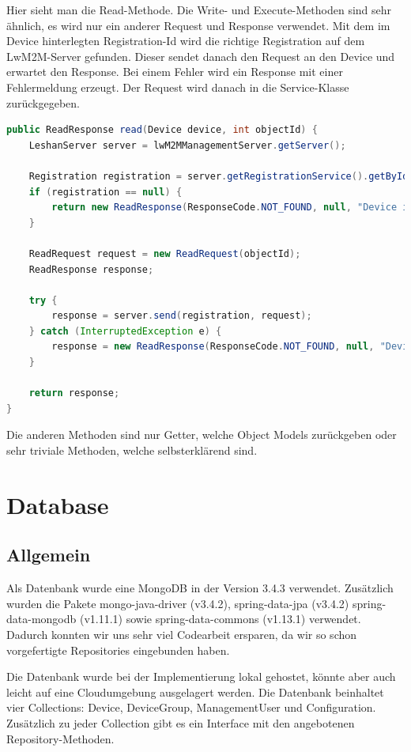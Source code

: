 Hier sieht man die Read-Methode. Die Write- und Execute-Methoden sind sehr ähnlich, es wird nur ein anderer Request und Response verwendet. Mit dem im Device hinterlegten Registration-Id wird die richtige Registration auf dem LwM2M-Server gefunden. Dieser sendet danach den Request an den Device und erwartet den Response. Bei einem Fehler wird ein Response mit einer Fehlermeldung erzeugt. Der Request wird danach in die Service-Klasse zurückgegeben.
\begin{lstlisting}[language=java]
public ReadResponse read(Device device, int objectId) {
	LeshanServer server = lwM2MManagementServer.getServer();

	Registration registration = server.getRegistrationService().getById(device.getRegId());
	if (registration == null) {
		return new ReadResponse(ResponseCode.NOT_FOUND, null, "Device is not reachable");
	}

	ReadRequest request = new ReadRequest(objectId);
	ReadResponse response;

	try {
		response = server.send(registration, request);
	} catch (InterruptedException e) {
		response = new ReadResponse(ResponseCode.NOT_FOUND, null, "Device is not reachable");
	}

	return response;
}
\end{lstlisting}

Die anderen Methoden sind nur Getter, welche Object Models zurückgeben oder sehr triviale Methoden, welche selbsterklärend sind.

\newpage

\section{Database}
\subsection{Allgemein}
Als Datenbank wurde eine MongoDB in der Version 3.4.3 verwendet. Zusätzlich wurden die Pakete mongo-java-driver (v3.4.2), spring-data-jpa (v3.4.2) spring-data-mongodb (v1.11.1) sowie spring-data-commons (v1.13.1) verwendet. Dadurch konnten wir uns sehr viel Codearbeit ersparen, da wir so schon vorgefertigte Repositories eingebunden haben.

Die Datenbank wurde bei der Implementierung lokal gehostet, könnte aber auch leicht auf eine Cloudumgebung ausgelagert werden. Die Datenbank beinhaltet vier Collections: Device, DeviceGroup, ManagementUser und Configuration. Zusätzlich zu jeder Collection gibt es ein Interface mit den angebotenen Repository-Methoden.
